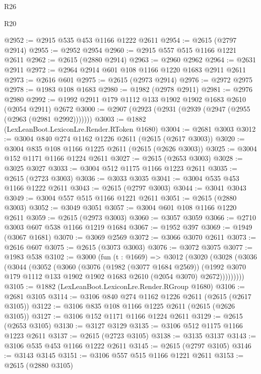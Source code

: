 \begin{lexlean}{R26}
\begin{lexlean}{R20}
\begin{coremodule}
{{{{{{{{{{{{{{{{{{{{{{{{{{{{{{{{{{{{{{{{{{{{{{{{{{{{{{{{{{{{{{{@2952 := @2915 @535 @453 @1166 @1222 @2611
@2954 := @2615 (@2797 @2914)
@2955 := @2952 @2954
@2960 := @2915 @557 @515 @1166 @1221 @2611
@2962 := @2615 (@2880 @2914)
@2963 := @2960 @2962
@2964 := @2631 @2911
@2972 := @2964 @2914 @601 @108 @1166 @1220 @1683 @2911 @2611
@2973 := @2616 @601
@2975 := @2615 (@2973 @2914)
@2976 := @2972 @2975
@2978 := @1983 @108 @1683
@2980 := @1982 (@2978 @2911)
@2981 := @2976 @2980
@2992 := @1992 @2911 @179 @1112 @133 @1902 @1902 @1683 @2610 (@2054 @2911) @2672
@3000 := @2907 (@2923 (@2931 (@2939 (@2947 (@2955 (@2963 (@2981 @2992)))))))
@3003 := @1882 (LexLeanBoot.LexiconLre.Render.RToken @1680)
@3004 := @2681 @3003
@3012 := @3004 @840 @274 @1162 @1226 @2611 (@2615 (@2617 @3003))
@3020 := @3004 @835 @108 @1166 @1225 @2611 (@2615 (@2626 @3003))
@3025 := @3004 @152 @1171 @1166 @1224 @2611
@3027 := @2615 (@2653 @3003)
@3028 := @3025 @3027
@3033 := @3004 @512 @1175 @1166 @1223 @2611
@3035 := @2615 (@2723 @3003)
@3036 := @3033 @3035
@3041 := @3004 @535 @453 @1166 @1222 @2611
@3043 := @2615 (@2797 @3003)
@3044 := @3041 @3043
@3049 := @3004 @557 @515 @1166 @1221 @2611
@3051 := @2615 (@2880 @3003)
@3052 := @3049 @3051
@3057 := @3004 @601 @108 @1166 @1220 @2611
@3059 := @2615 (@2973 @3003)
@3060 := @3057 @3059
@3066 := @2710 @3003 @607 @538 @1166 @1219 @1684
@3067 := @1952 @397
@3069 := @1949 (@3067 @1681)
@3070 := @3069 @2569
@3072 := @3066 @3070 @2611
@3073 := @2616 @607
@3075 := @2615 (@3073 @3003)
@3076 := @3072 @3075
@3077 := @1983 @538
@3102 := @3000
    (fun (t : @1669) =>
    @3012
      (@3020
        (@3028
          (@3036
            (@3044
              (@3052
                (@3060
                  (@3076
                    (@1982 (@3077 @1684 @2569))
                    (@1992
                      @3070
                      @179
                      @1112
                      @133
                      @1902
                      @1902
                      @1683
                      @2610
                      (@2054 @3070)
                      @2672)))))))))
@3105 := @1882 (LexLeanBoot.LexiconLre.Render.RGroup @1680)
@3106 := @2681 @3105
@3114 := @3106 @840 @274 @1162 @1226 @2611 (@2615 (@2617 @3105))
@3122 := @3106 @835 @108 @1166 @1225 @2611 (@2615 (@2626 @3105))
@3127 := @3106 @152 @1171 @1166 @1224 @2611
@3129 := @2615 (@2653 @3105)
@3130 := @3127 @3129
@3135 := @3106 @512 @1175 @1166 @1223 @2611
@3137 := @2615 (@2723 @3105)
@3138 := @3135 @3137
@3143 := @3106 @535 @453 @1166 @1222 @2611
@3145 := @2615 (@2797 @3105)
@3146 := @3143 @3145
@3151 := @3106 @557 @515 @1166 @1221 @2611
@3153 := @2615 (@2880 @3105)
}}}}}}}}}}}}}}}}}}}}}}}}}}}}}}}}}}}}}}}}}}}}}}}}}}}}}}}}}}}}}}}
\end{coremodule}
\end{lexlean}
\end{lexlean}
